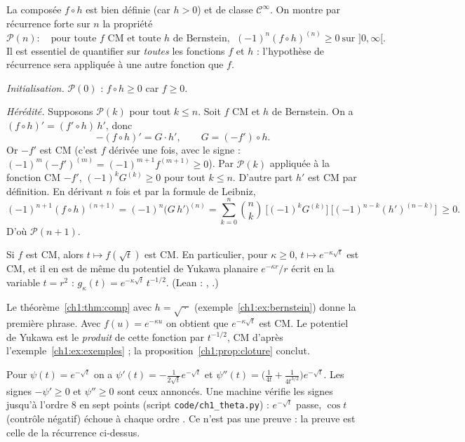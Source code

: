 \begin{humanproof}
La composée $f\circ h$ est bien définie (car $h>0$) et de classe $\mathcal C^\infty$. On montre par récurrence forte sur $n$ la propriété
\[
  \mathcal P(n) :\quad \text{pour toute } f \text{ CM et toute } h \text{ de Bernstein},\ \ (-1)^n(f\circ h)^{(n)}\ge0\ \text{sur }]0,\infty[.
\]
Il est essentiel de quantifier sur \emph{toutes} les fonctions $f$ et $h$ : l'hypothèse de récurrence sera appliquée à une autre fonction que $f$.

\emph{Initialisation.} $\mathcal P(0)$ : $f\circ h\ge0$ car $f\ge0$.

\emph{Hérédité.} Supposons $\mathcal P(k)$ pour tout $k\le n$. Soit $f$ CM et $h$ de Bernstein. On a $(f\circ h)'=(f'\circ h)\,h'$, donc
\[
  -(f\circ h)'=G\cdot h',\qquad G=(-f')\circ h .
\]
Or $-f'$ est CM (c'est $f$ dérivée une fois, avec le signe : $(-1)^m(-f')^{(m)}=(-1)^{m+1}f^{(m+1)}\ge0$). Par $\mathcal P(k)$ appliquée à la fonction CM $-f'$,
$(-1)^kG^{(k)}\ge0$ pour tout $k\le n$. D'autre part $h'$ est CM par définition. En dérivant $n$ fois et par la formule de Leibniz,
\[
  (-1)^{n+1}(f\circ h)^{(n+1)}=(-1)^{n}\bigl(G\,h'\bigr)^{(n)}=\sum_{k=0}^{n}\binom nk\ \bigl[(-1)^kG^{(k)}\bigr]\ \bigl[(-1)^{n-k}(h')^{(n-k)}\bigr]\ \ge0 .
\]
D'où $\mathcal P(n+1)$.
\end{humanproof}

\begin{corollary}\label{ch1:cor:sqrt}
Si $f$ est CM, alors $t\mapsto f(\sqrt t)$ est CM. En particulier, pour $\kappa\ge0$, $t\mapsto e^{-\kappa\sqrt t}$ est CM, et il en est de même du
potentiel de Yukawa planaire $e^{-\kappa r}/r$ écrit en la variable $t=r^2$ : $g_\kappa(t)=e^{-\kappa\sqrt t}\,t^{-1/2}$. \tierC{}
(Lean : ,  \tierA{}.)
\end{corollary}

\begin{humanproof}
Le théorème~\ref{ch1:thm:comp} avec $h=\sqrt{\ \cdot\ }$ (exemple~\ref{ch1:ex:bernstein}) donne la première phrase. Avec $f(u)=e^{-\kappa u}$ on obtient que
$e^{-\kappa\sqrt t}$ est CM. Le potentiel de Yukawa est le \emph{produit} de cette fonction par $t^{-1/2}$, CM d'après l'exemple~\ref{ch1:ex:exemples} ;
la proposition~\ref{ch1:prop:cloture} conclut.
\end{humanproof}

\begin{remark}
Pour $\psi(t)=e^{-\sqrt t}$ on a $\psi'(t)=-\frac{1}{2\sqrt t}e^{-\sqrt t}$ et $\psi''(t)=\bigl(\frac1{4t}+\frac1{4t^{3/2}}\bigr)e^{-\sqrt t}$. Les signes
$-\psi'\ge0$ et $\psi''\ge0$ sont ceux annoncés. Une machine vérifie les signes jusqu'à l'ordre $8$ en sept points
(script \texttt{code/ch1\_theta.py}) : $e^{-\sqrt t}$ passe, $\cos t$ (contrôle négatif) échoue à chaque ordre \tierX{}. Ce n'est pas une preuve :
la preuve est celle de la récurrence ci-dessus.
\end{remark}

